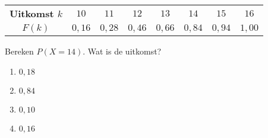    \begin{center}
        \begin{tabular}{cccccccc}
            \toprule
                {\bfseries Uitkomst $k$} & $10$ & $11$ & $12$ & $13$ & $14$ & $15$ & $16$\\
            \cmidrule{1-1} \cmidrule{2-2} \cmidrule{3-3} \cmidrule{4-4} \cmidrule{5-5} \cmidrule{6-6} \cmidrule{7-7} \cmidrule{8-8}
                $F(k)$ & $0,16$ & $0,28$ & $0,46$ & $0,66$ & $0,84$ & $0,94$ & $1,00$\\
            \bottomrule
        \end{tabular}
    \end{center}
    Bereken $P(X=14)$. Wat is de uitkomst?

\begin{enumerate}[label=(\alph*)]
    \item $0,18$
    \item $0,84$
    \item $0,10$
    \item $0,16$
\end{enumerate}
